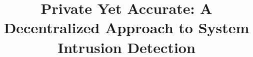 \documentclass[conference]{./sty/IEEEtran-3}
\begin{document}
\title{Private Yet Accurate: A Decentralized Approach to System Intrusion Detection}

\maketitle


% 
% 


% 


% 



% 


% 
% 

% 
% 
% 

\balance

{
\footnotesize
\setlength{\bibsep}{3pt}
}

\end{document}
